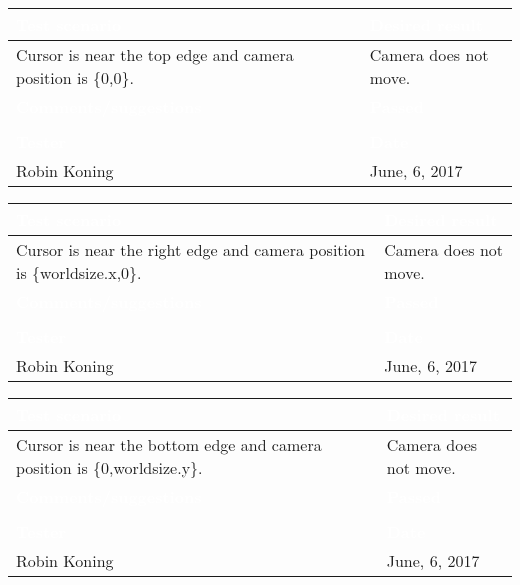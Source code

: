 \begin{tabularx}{\textwidth}{|X|X|}
\hline
\rowcolor{lightgray}\textcolor{white}{\textbf{Test scenario}} &
\textcolor{white}{\textbf{Desired result}}       
\\\hline
Cursor is near the top edge and camera position is \{0,0\}. &
Camera does not move.         
\\\hline
\rowcolor{lightgray}\textcolor{white}{\textbf{Comments/suggestions}} & 
\textcolor{white}{\textbf{Passed}}
\\\hline
 & \cellcolor{green}                       
\\\hline
\rowcolor{lightgray}\textcolor{white}{\textbf{Tester}} & 
\textcolor{white}{\textbf{Date}}               
\\\hline
Robin Koning & June, 6, 2017                               		 
\\\hline
\end{tabularx}

\begin{tabularx}{\textwidth}{|X|X|}
\hline
\rowcolor{lightgray}\textcolor{white}{\textbf{Test scenario}} &
\textcolor{white}{\textbf{Desired result}}       
\\\hline
Cursor is near the right edge and camera position is \{worldsize.x,0\}. &
Camera does not move.         
\\\hline
\rowcolor{lightgray}\textcolor{white}{\textbf{Comments/suggestions}} & 
\textcolor{white}{\textbf{Passed}}
\\\hline
 & \cellcolor{green}                       
\\\hline
\rowcolor{lightgray}\textcolor{white}{\textbf{Tester}} & 
\textcolor{white}{\textbf{Date}}               
\\\hline
Robin Koning & June, 6, 2017                               		 
\\\hline
\end{tabularx}

\begin{tabularx}{\textwidth}{|X|X|}
\hline
\rowcolor{lightgray}\textcolor{white}{\textbf{Test scenario}} &
\textcolor{white}{\textbf{Desired result}}       
\\\hline
Cursor is near the bottom edge and camera position is \{0,worldsize.y\}. &
Camera does not move.         
\\\hline
\rowcolor{lightgray}\textcolor{white}{\textbf{Comments/suggestions}} & 
\textcolor{white}{\textbf{Passed}}
\\\hline
 & \cellcolor{green}                       
\\\hline
\rowcolor{lightgray}\textcolor{white}{\textbf{Tester}} & 
\textcolor{white}{\textbf{Date}}               
\\\hline
Robin Koning & June, 6, 2017                               		 
\\\hline
\end{tabularx}

